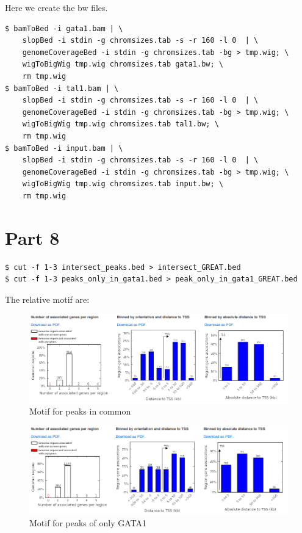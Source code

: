 \documentclass[11pt]{article} %
\begin{document}
Here we create the bw files.

\begin{lstlisting}
$ bamToBed -i gata1.bam | \
    slopBed -i stdin -g chromsizes.tab -s -r 160 -l 0  | \
    genomeCoverageBed -i stdin -g chromsizes.tab -bg > tmp.wig; \
    wigToBigWig tmp.wig chromsizes.tab gata1.bw; \
    rm tmp.wig
$ bamToBed -i tal1.bam | \
    slopBed -i stdin -g chromsizes.tab -s -r 160 -l 0  | \
    genomeCoverageBed -i stdin -g chromsizes.tab -bg > tmp.wig; \
    wigToBigWig tmp.wig chromsizes.tab tal1.bw; \
    rm tmp.wig
$ bamToBed -i input.bam | \
    slopBed -i stdin -g chromsizes.tab -s -r 160 -l 0  | \
    genomeCoverageBed -i stdin -g chromsizes.tab -bg > tmp.wig; \
    wigToBigWig tmp.wig chromsizes.tab input.bw; \
    rm tmp.wig
\end{lstlisting}

\section{Part 8}

\begin{lstlisting}
$ cut -f 1-3 intersect_peaks.bed > intersect_GREAT.bed
$ cut -f 1-3 peaks_only_in_gata1.bed > peak_only_in_gata1_GREAT.bed
\end{lstlisting}

The relative motif are:

\begin{figure}[h]
	\caption{Motif for peaks in common}
	\includegraphics[width=\textwidth]{common}
\end{figure}


\begin{figure}[h]
	\caption{Motif for peaks of only GATA1}
	\includegraphics[width=\textwidth]{only_gata1}
\end{figure}
\end{document}
